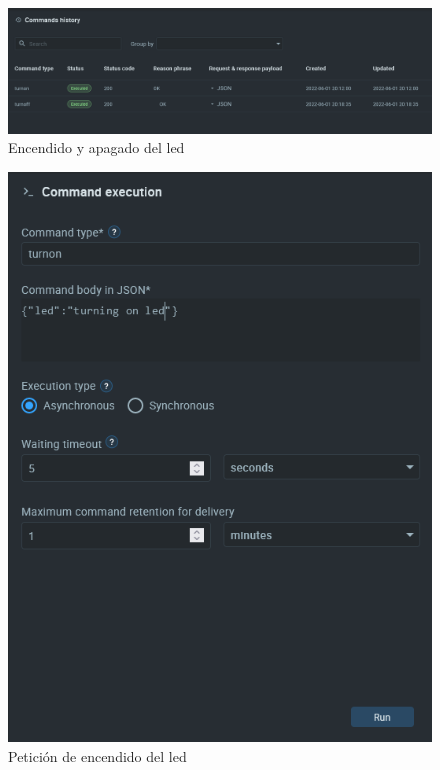 \begin{figure}[p]
    \centering
    \includegraphics[width=\linewidth]{imagenes/command-execution.png}
    \caption{Encendido y apagado del led}
    \label{fig:figure14}
\end{figure}

\begin{figure}[p]
    \centering
    \includegraphics[width=\linewidth]{imagenes/turn-on-led.png}
    \caption{Petición de encendido del led}
    \label{fig:figure15}
\end{figure}

